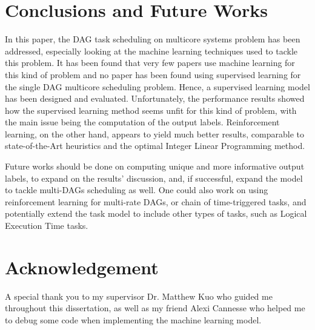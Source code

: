 \documentclass[conference]{IEEEtran}
\begin{document}









\section{Conclusions and Future Works}


In this paper, the DAG task scheduling on multicore systems problem
has been addressed, especially looking at the machine learning
techniques used to tackle this problem.
It has been found that very few papers use machine learning
for this kind of problem and no paper has been found using 
supervised learning for the single DAG multicore scheduling problem.
Hence, a supervised learning model has been designed and evaluated.
Unfortunately, the performance results 
showed how the supervised learning method seems unfit for this kind of 
problem, with the main issue being the computation of the output labels.
Reinforcement learning, on the other hand, appears to yield much better results, comparable
to state-of-the-Art heuristics and the optimal Integer Linear Programming method.

Future works should be done on computing unique and more informative output labels,
to expand on the results' discussion,
and, if successful, expand the model to tackle multi-DAGs scheduling as well. 
One could also work on using reinforcement learning for 
multi-rate DAGs, or chain of time-triggered tasks, and potentially
extend the task model to include other types of tasks,
such as Logical Execution Time tasks.










\section*{Acknowledgement}

A special thank you to my supervisor Dr. Matthew Kuo
who guided me throughout this dissertation,
as well as my friend Alexi Cannesse who helped 
me to debug some code when implementing the machine learning model.




\end{document}
